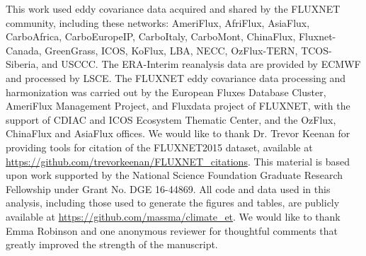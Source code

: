 \documentclass[12pt]{article}
\begin{document}
\acknowledgments This work used eddy covariance data acquired and shared
by the FLUXNET community, including these networks: AmeriFlux, AfriFlux,
AsiaFlux, CarboAfrica, CarboEuropeIP, CarboItaly, CarboMont,
ChinaFlux, Fluxnet-Canada, GreenGrass, ICOS, KoFlux, LBA, NECC,
OzFlux-TERN, TCOS-Siberia, and USCCC. The ERA-Interim reanalysis data
are provided by ECMWF and processed by LSCE. The FLUXNET eddy covariance
data processing and harmonization was carried out by the European Fluxes
Database Cluster, AmeriFlux Management Project, and Fluxdata project of
FLUXNET, with the support of CDIAC and ICOS Ecosystem Thematic Center,
and the OzFlux, ChinaFlux and AsiaFlux offices. We would like to thank
Dr. Trevor Keenan for providing tools for citation of the FLUXNET2015
dataset, available at
\url{https://github.com/trevorkeenan/FLUXNET_citations}. This material is
based upon work supported by the National Science Foundation Graduate
Research Fellowship under Grant No. DGE 16-44869. All code and data used
in this analysis, including those used to generate the figures and
tables, are publicly available at
\url{https://github.com/massma/climate\_et}. We would
like to thank Emma Robinson and one anonymous reviewer for thoughtful
comments that greatly improved the strength of the manuscript.


\end{document}
